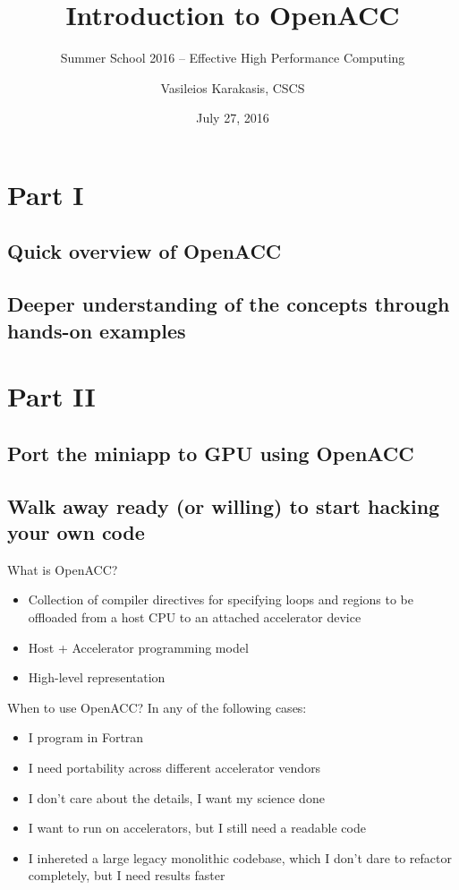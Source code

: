 \documentclass[12pt,aspectratio=169]{beamer}
\author{Vasileios Karakasis, CSCS}
\title{Introduction to OpenACC}
\subtitle{Summer School 2016 -- Effective High Performance Computing}
\date{July 27, 2016}
\begin{document}
\cscstitle


\section{Part I}
\subsection{Quick overview of OpenACC}
\subsection{Deeper understanding of the concepts through hands-on examples}

\section{Part II}
\subsection{Port the miniapp to GPU using OpenACC}
\subsection{Walk away ready (or willing) to start hacking your own code}

\begin{frame}{What is OpenACC?}
  \begin{itemize}
  \item Collection of compiler directives for specifying loops and regions to be
    offloaded from a host CPU to an attached accelerator device
  \item Host + Accelerator programming model
  \item High-level representation
  \end{itemize}
\end{frame}

\begin{frame}{When to use OpenACC?}
  In any of the following cases:
  \vspace\baselineskip
  \begin{itemize}
  \item I program in Fortran
  \item I need portability across different accelerator vendors
  \item I don't care about the details, I want my science done
  \item I want to run on accelerators, but I still need a readable code
  \item I inhereted a large legacy monolithic codebase, which I don't dare to
    refactor completely, but I need results faster
  \end{itemize}
\end{frame}
\end{document}
